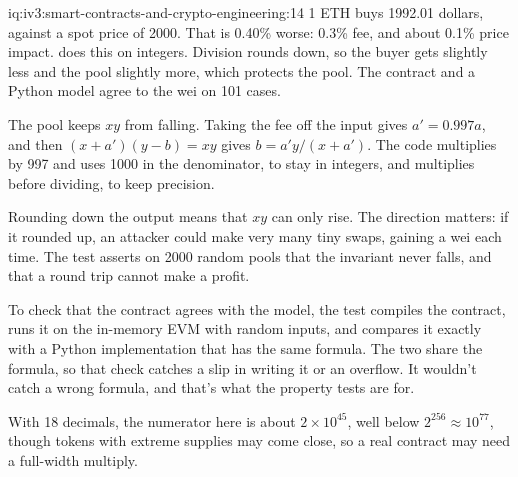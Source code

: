 \begin{solution}{iq:iv3:smart-contracts-and-crypto-engineering:14}
1 ETH buys 1992.01 dollars, against a spot price of 2000. That is 0.40\% worse: 0.3\% fee, and about 0.1\% price impact.  does this on integers. Division rounds down, so the buyer gets slightly less and the pool slightly more, which protects the pool. The contract and a Python model agree to the wei on 101 cases.
\label{lst:iv3:cr:amm}

The pool keeps $x y$ from falling. Taking the fee off the input gives $a' = 0.997 a$, and then $(x + a')(y - b) = xy$ gives $b = a' y / (x + a')$. The code multiplies by 997 and uses 1000 in the denominator, to stay in integers, and multiplies before dividing, to keep precision.

Rounding down the output means that $x y$ can only rise. The direction matters: if it rounded up, an attacker could make very many tiny swaps, gaining a wei each time. The test asserts on 2000 random pools that the invariant never falls, and that a round trip cannot make a profit.

To check that the contract agrees with the model, the test compiles the contract, runs it on the in-memory EVM with random inputs, and compares it exactly with a Python implementation that has the same formula. The two share the formula, so that check catches a slip in writing it or an overflow. It wouldn't catch a wrong formula, and that's what the property tests are for.

With 18 decimals, the numerator here is about $2 \times 10^{45}$, well below $2^{256} \approx 10^{77}$, though tokens with extreme supplies may come close, so a real contract may need a full-width multiply.

\end{solution}

